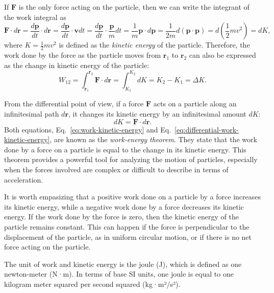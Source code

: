 \documentclass[12pt]{article}
\begin{document}
If $\mathbf{F}$ is the only force acting on the particle, then we can write the integrant of the work integral as
\begin{equation}
    \mathbf{F}\cdot d\mathbf{r} = \frac{d\mathbf{p}}{dt}\cdot d\mathbf{r} = \frac{d\mathbf{p}}{dt}\cdot \mathbf{v} dt = \frac{d\mathbf{p}}{dt}\cdot \frac{\mathbf{p}}{m} dt = \frac{1}{m}\mathbf{p}\cdot d\mathbf{p} = \frac{1}{2m} d(\mathbf{p}\cdot\mathbf{p}) = d\left(\frac{1}{2} m v^2\right) = dK,
\end{equation}
where $K = \frac{1}{2} m v^2$ is defined as the \emph{kinetic energy} of the particle. Therefore, the work done by the force as the particle moves from $\mathbf{r}_1$ to $\mathbf{r}_2$ can also be expressed as the change in kinetic energy of the particle:
\begin{equation}
    W_{12} = \int_{\mathbf{r}_1}^{\mathbf{r}_2} \mathbf{F}\cdot d\mathbf{r} = \int_{K_1}^{K_2} dK = K_2 - K_1 = \Delta K.
    \label{eq:work-kinetic-energy}
\end{equation}

From the differential point of view, if a force $\mathbf{F}$ acts on a particle along an infinitesimal path $d\mathbf{r}$, it changes its kinetic energy by an infinitesimal amount $dK$:
\begin{equation}
    dK = \mathbf{F}\cdot d\mathbf{r}.
    \label{eq:differential-work-kinetic-energy}
\end{equation}
Both equations, Eq.~\eqref{eq:work-kinetic-energy} and Eq.~\eqref{eq:differential-work-kinetic-energy}, are known as the \emph{work-energy theorem}. They state that the work done by a force on a particle is equal to the change in its kinetic energy. This theorem provides a powerful tool for analyzing the motion of particles, especially when the forces involved are complex or difficult to describe in terms of acceleration.

It is worth empasizing that a positive work done on a particle by a force increases its kinetic energy, while a negative work done by a force decreases its kinetic energy. If the work done by the force is zero, then the kinetic energy of the particle remains constant. This can happen if the force is perpendicular to the displacement of the particle, as in uniform circular motion, or if there is no net force acting on the particle.

The unit of work and kinetic energy is the joule (J), which is defined as one newton-meter (N·m). In terms of base SI units, one joule is equal to one kilogram meter squared per second squared (kg·m²/s²).
\end{document}
